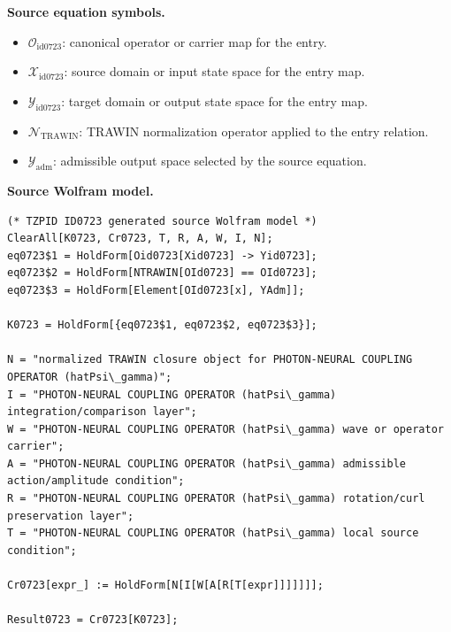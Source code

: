 \begin{minipage}[t]{0.49\linewidth}
\begingroup
\small
\raggedright
\textbf{Source equation symbols.}\par
\begin{itemize}[leftmargin=1.35em,itemsep=1pt,topsep=1pt,parsep=0pt]
    \item $\mathcal{O}_{\mathrm{id0723}}$: canonical operator or carrier map for the entry.
    \item $\mathcal{X}_{\mathrm{id0723}}$: source domain or input state space for the entry map.
    \item $\mathcal{Y}_{\mathrm{id0723}}$: target domain or output state space for the entry map.
    \item $\mathcal{N}_{\mathrm{TRAWIN}}$: TRAWIN normalization operator applied to the entry relation.
    \item $\mathcal{Y}_{\mathrm{adm}}$: admissible output space selected by the source equation.
\end{itemize}
\endgroup
\end{minipage}\hfill
\begin{minipage}[t]{0.47\linewidth}
\begingroup
\scriptsize
\raggedright
\textbf{Source Wolfram model.}\par
\begin{Verbatim}[fontsize=\tiny,breaklines=true,breakanywhere=true]
(* TZPID ID0723 generated source Wolfram model *)
ClearAll[K0723, Cr0723, T, R, A, W, I, N];
eq0723$1 = HoldForm[Oid0723[Xid0723] -> Yid0723];
eq0723$2 = HoldForm[NTRAWIN[OId0723] == OId0723];
eq0723$3 = HoldForm[Element[OId0723[x], YAdm]];

K0723 = HoldForm[{eq0723$1, eq0723$2, eq0723$3}];

N = "normalized TRAWIN closure object for PHOTON-NEURAL COUPLING OPERATOR (hatPsi\_gamma)";
I = "PHOTON-NEURAL COUPLING OPERATOR (hatPsi\_gamma) integration/comparison layer";
W = "PHOTON-NEURAL COUPLING OPERATOR (hatPsi\_gamma) wave or operator carrier";
A = "PHOTON-NEURAL COUPLING OPERATOR (hatPsi\_gamma) admissible action/amplitude condition";
R = "PHOTON-NEURAL COUPLING OPERATOR (hatPsi\_gamma) rotation/curl preservation layer";
T = "PHOTON-NEURAL COUPLING OPERATOR (hatPsi\_gamma) local source condition";

Cr0723[expr_] := HoldForm[N[I[W[A[R[T[expr]]]]]]];

Result0723 = Cr0723[K0723];
\end{Verbatim}
\endgroup
\end{minipage}

